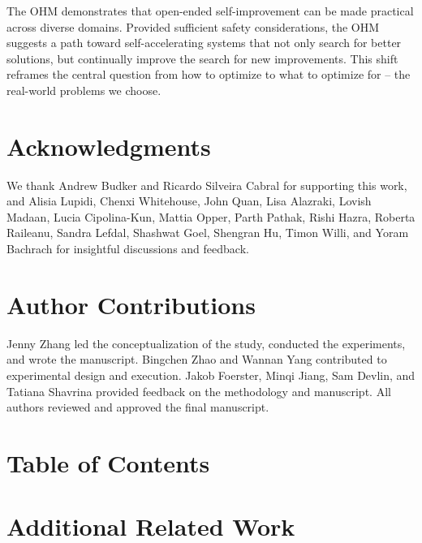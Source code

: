 \documentclass[]{fairmeta}
\begin{document}
The OHM demonstrates that open-ended self-improvement can be made practical across diverse domains. Provided sufficient safety considerations, the OHM suggests a path toward self-accelerating systems that not only search for better solutions, but continually improve the search for new improvements. This shift reframes the central question from how to optimize to what to optimize for -- the real-world problems we choose.

\section*{Acknowledgments}
We thank Andrew Budker and Ricardo Silveira Cabral for supporting this work, and Alisia Lupidi, Chenxi Whitehouse, John Quan, Lisa Alazraki, Lovish Madaan, Lucia Cipolina-Kun, Mattia Opper, Parth Pathak, Rishi Hazra, Roberta Raileanu, Sandra Lefdal, Shashwat Goel, Shengran Hu, Timon Willi, and Yoram Bachrach for insightful discussions and feedback.

\section*{Author Contributions}
Jenny Zhang led the conceptualization of the study, conducted the experiments, and wrote the manuscript. Bingchen Zhao and Wannan Yang contributed to experimental design and execution. Jakob Foerster, Minqi Jiang, Sam Devlin, and Tatiana Shavrina provided feedback on the methodology and manuscript. All authors reviewed and approved the final manuscript.




\clearpage

\beginappendix

\section*{Table of Contents}
\startcontents[sections]
\clearpage


\section{Additional Related Work}
\label{app:related-work}
\end{document}
